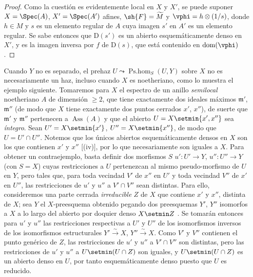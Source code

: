 \begin{proof}
Como la cuestión es evidentemente local en $X$ y $X'$, se puede suponer $X=\Spec(A)$, $X'=\Spec(A')$ afines, $\sh{F}=\widetilde{M}$ y $\vphi=h\otimes(1/s)$, donde $h\in M$ y $s$ es un elemento regular de $A$ cuya imagen $s'$ en $A'$ es un elemento regular.
Se sabe entonces  que $\mathrm{D}(s')$ es un abierto esquemáticamente denso en $X'$, y es la imagen inversa por $f$ de $\mathrm{D}(s)$, que está contenido en $\operatorname{dom}(\vphi)$.
\end{proof}

\begin{remark}[20.2.16]
\label{IV.20.2.16}
Cuando $Y$ no es separado, el prehaz $U\leadsto\operatorname{Ps.hom}_S(U,Y)$ sobre $X$ no es necesariamente un haz, incluso cuando $X$ es noetheriano, como lo muestra el ejemplo siguiente.
  Tomaremos para $X$ el espectro de un anillo \emph{semilocal} noetheriano $A$ de dimensión $\geq2$, que tiene exactamente dos
  ideales máximos $\mathfrak{m}'$, $\mathfrak{m}''$ (de modo que $X$ tiene exactamente dos puntos cerrados $x'$, $x''$), de suerte que $\mathfrak{m}'$ y $\mathfrak{m}''$ pertenecen a $\operatorname{Ass}(A)$ y que el abierto $U=X\setmin\{x',x''\}$ sea \emph{íntegro}.
Sean $U'=X\setmin\{x'\}$, $U''=X\setmin\{x''\}$, de modo que $U=U'\cap U''$.
Notemos que los únicos abiertos esquemáticamente densos en $X$ son los que contienen $x'$ y $x''$ [(iv)], por lo que necesariamente son iguales a $X$.
Para obtener un contraejemplo, basta definir dos morfismos $S$ $u':U'\to Y$, $u'':U''\to Y$ (con $S=X$) cuyas restricciones a $U$ pertenezcan al mismo pseudo-morfismo de $U$ en $Y$, pero tales que, para toda vecindad $V'$ de $x''$ en $U'$ y toda vecindad $V''$ de $x'$ en $U''$, las restricciones de $u'$ y $u''$ a $V'\cap V''$ sean distintas.
Para ello, consideremos una parte cerrada \emph{irreducible} $Z$ de $X$ que contiene $x'$ y $x''$, distinta de $X$; sea $Y$ el $X$-preesquema obtenido pegando dos preesquemas $Y'$, $Y''$ isomorfos a $X$ a lo largo del abierto por doquier denso $X\setmin Z$ .
Se tomarán entonces para $u'$ y $u''$ las restricciones respectivas a $U'$ y $U''$ de los isomorfismos inversos de los isomorfismos estructurales $Y'\xrightarrow{\sim}X$, $Y''\xrightarrow{\sim}X$.
Como $V'$ y $V''$ contienen el punto genérico de $Z$, las restricciones de $u'$ y $u''$ a $V'\cap V''$ son distintas, pero las restricciones de $u'$ y $u''$ a $U\setmin(U\cap Z)$ son iguales, y $U\setmin(U\cap Z)$ es un abierto denso en $U$, por tanto esquemáticamente denso puesto que $U$ es reducido.


\end{remark}
